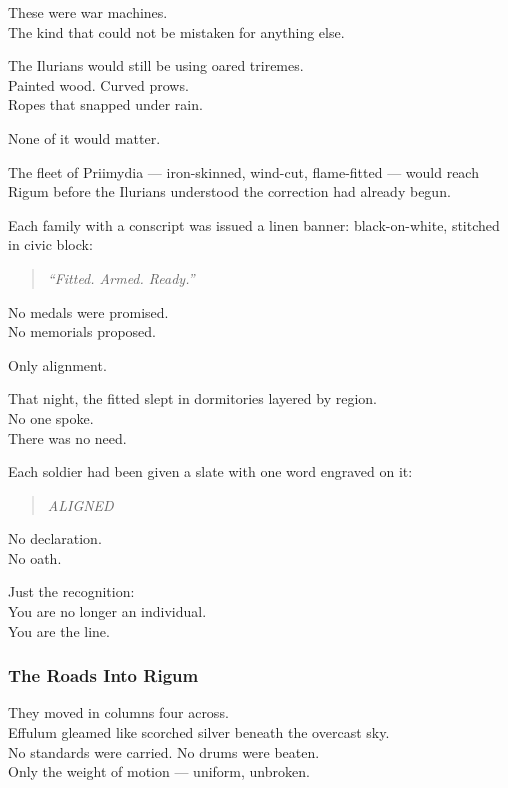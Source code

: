 \documentclass[12pt]{article}
\begin{document}
These were war machines.\\
The kind that could not be mistaken for anything else.

\vspace{1em}

The Ilurians would still be using oared triremes.\\
Painted wood. Curved prows.\\
Ropes that snapped under rain.

None of it would matter.

The fleet of Priimydia — iron-skinned, wind-cut, flame-fitted — would reach Rigum before the Ilurians understood the correction had already begun.

\vspace{1em}

Each family with a conscript was issued a linen banner: black-on-white, stitched in civic block:

\begin{quote}
\textit{“Fitted. Armed. Ready.”}
\end{quote}

No medals were promised.\\
No memorials proposed.

Only alignment.

\vspace{1em}

That night, the fitted slept in dormitories layered by region.\\
No one spoke.\\
There was no need.

Each soldier had been given a slate with one word engraved on it:

\begin{quote}
\textit{ALIGNED}
\end{quote}

No declaration.\\
No oath.

Just the recognition:\\
You are no longer an individual.\\
You are the line.

\dotfill

\subsubsection*{The Roads Into Rigum}

They moved in columns four across.\\
Effulum gleamed like scorched silver beneath the overcast sky.\\
No standards were carried. No drums were beaten.\\
Only the weight of motion — uniform, unbroken.
\end{document}
